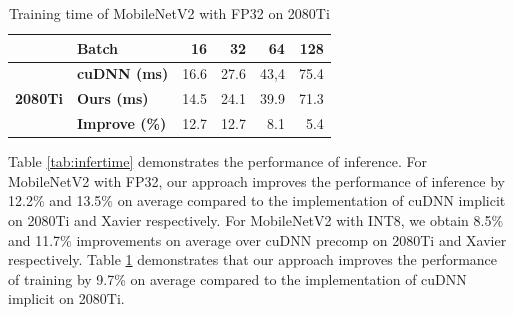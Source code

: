 \begin{table}[]

    \caption{Training time of MobileNetV2 with FP32 on 2080Ti}
    \vspace{-3mm}
    \label{tab:traintime}
    \centering
    \begin{threeparttable}
    \begin{tabular}{c|l|rrrr}
    \toprule
    &\textbf{Batch} & 16& 32 &64 & 128\\
    \midrule
    \multirow{3}{*}{\textbf{2080Ti}}&\textbf{cuDNN (ms)} & 16.6 & 27.6 & 43,4 &75.4 \\
    &\textbf{Ours (ms)} & 14.5  &24.1 &39.9 &71.3\\
    &\textbf{Improve (\%)} &12.7  &12.7 &8.1 &5.4 \\
    \bottomrule
    \end{tabular}
    \footnotesize
    \end{threeparttable}
    \vspace{-5mm}
\end{table}
Table \ref{tab:infertime} demonstrates the performance of inference.
For MobileNetV2 with FP32, our approach improves the performance of inference by 12.2\% and 13.5\% on average compared to the implementation of cuDNN implicit on 2080Ti and Xavier respectively. 
For MobileNetV2 with INT8, we obtain 8.5\% and 11.7\% improvements on average over cuDNN precomp on 2080Ti and Xavier respectively. 
Table \ref{tab:traintime} demonstrates that our approach improves the performance of training by 9.7\% on average compared to the implementation of cuDNN implicit on 2080Ti.











